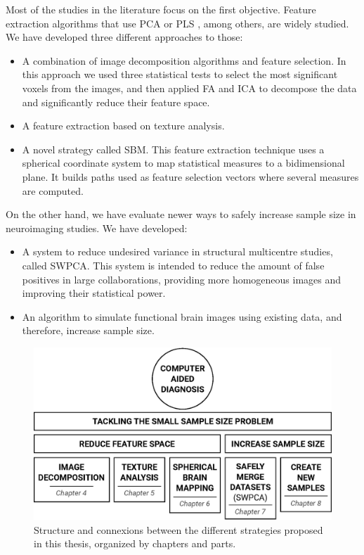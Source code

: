 Most of the studies in the literature focus on the first objective. Feature extraction algorithms that use \acf{PCA} \cite{Khedher2015,Towey2011} or \acf{PLS} \cite{Segovia2013}, among others, are widely studied. We have developed three different approaches to those:

\begin{itemize}
	\item A combination of image decomposition algorithms and feature selection. In this approach we used three statistical tests to select the most significant voxels from the images, and then applied \acf{FA} and \acf{ICA} to decompose the data and significantly reduce their feature space. 
	\item A feature extraction based on texture analysis. 
	\item A novel strategy called \acf{SBM}. This feature extraction technique uses a spherical coordinate system to map statistical measures to a bidimensional plane. It builds paths used as feature selection vectors where several measures are computed. 
\end{itemize}

On the other hand, we have evaluate newer ways to safely increase sample size in neuroimaging studies. We have developed: 
 \begin{itemize}
 	\item A system to reduce undesired variance in structural multicentre studies, called \acf{SWPCA}. This system is intended to reduce the amount of false positives in large collaborations, providing more homogeneous images and improving their statistical power. 
 	\item An algorithm to simulate functional brain images using existing data, and therefore, increase sample size. 
 \end{itemize}

\begin{figure}
	\centering
	\includegraphics[width=0.7\linewidth]{Graphics/ch1/outline}
	\caption[Structure of the thesis.]{Structure and connexions between the different strategies proposed in this thesis, organized by chapters and parts.}
	\label{fig:outline}
\end{figure}


